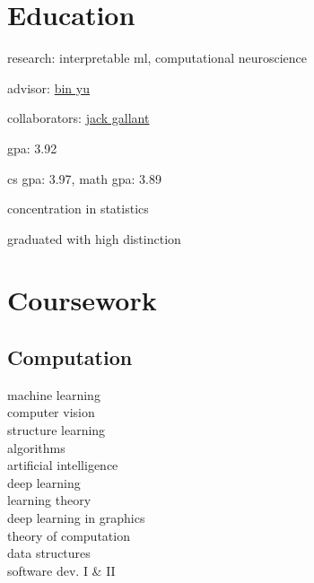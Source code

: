 
\begin{minipage}[t]{0.33\textwidth} %


\section{Education} 
\vspace{\topsep} %
\vspace{1pt}
\begin{tightitemize}
\item research: interpretable ml, computational neuroscience
\item advisor: \href{https://www.stat.berkeley.edu/~binyu/Site/Welcome.html}{bin yu} 
\item collaborators: \href{http://gallantlab.org/}{jack gallant}
\item gpa: 3.92
\end{tightitemize}
\vspace{6pt}

\begin{tightitemize}
\item cs gpa: 3.97, math gpa: 3.89
\item concentration in statistics
\item graduated with high distinction
\end{tightitemize}


\sectionspace %

\section{Coursework}
\subsection{Computation}
machine learning \\
computer vision \\
structure learning \\
algorithms \\
artificial intelligence \\
deep learning \\
learning theory \\
deep learning in graphics \\
theory of computation \\
data structures \\
software dev. I \& II\\
\sectionspace


\end{minipage}
